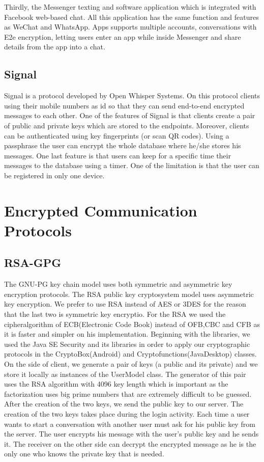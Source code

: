 \documentclass[11pt,a4paper]{report}
\begin{document}
Thirdly, the Messenger texting and software application which is integrated with Facebook web-based chat. All this application has the same function and features as WeChat and WhatsApp.  Apps supports multiple accounts, conversations with E2e encryption, letting users enter an app while inside Messenger and share details from the app into a chat.

\subsection{Signal}
Signal is a protocol developed by Open Whisper Systems. On this protocol clients using their mobile numbers as id so that they can send end-to-end encrypted messages to each other. One of the features of Signal is that clients create a pair of public and private keys which are stored to the endpoints. Moreover, clients can be authenticated using key fingerprints (or scan QR codes). Using a passphrase the user can encrypt the whole database where he/she stores his messages. One last feature is that users can keep for a specific time their messages to the database using a timer. One of the limitation is that the user can be registered in only one device.

\section{Encrypted Communication Protocols}

\subsection{RSA-GPG}
The GNU-PG key chain model uses both symmetric and asymmetric key encryption protocols. The RSA public key cryptosystem model uses asymmetric key encryption. We prefer to use RSA instead of AES or 3DES for the reason that the last two is symmetric key encryptio. For the RSA we used the cipheralgorithm of ECB(Electronic Code Book) instead of OFB,CBC and CFB as it is faster and simpler on his implementation. Beginning with the libraries, we used the Java SE Security and its libraries in order to apply our cryptographic protocols in the CryptoBox(Android) and Cryptofunctions(JavaDesktop) classes. On the side of client, we generate a pair of keys (a public and its private) and we store it locally as instances of the UserModel class. The generator of this pair uses the RSA algorithm with 4096 key length which is important as the factorization uses big prime numbers that are extremely difficult to be guessed. After the creation of the two keys, we send the public key to our server. The creation of the two keys takes place during the login activity. Each time a user wants to start a conversation with another user must ask for his public key from the server. The user encrypts his message with the user’s public key and he sends it. The receiver on the other side can decrypt the encrypted message as he is the only one who knows the private key that is needed.
\end{document}
